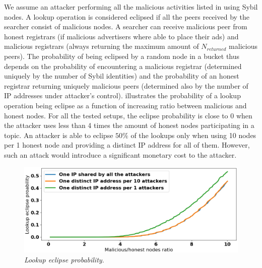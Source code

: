 We assume an attacker performing all the malicious activities listed in  using Sybil nodes. A lookup operation is considered eclipsed if all the peers received by the searcher consist of malicious nodes. A searcher can receive malicious peer from honest registrars (if malicious advertisers where able to place their ads) and malicious registrars (always returning the maximum amount of $N_\textit{returned}$ malicious peers). The probability of being eclipsed by a random node in a bucket thus depends on the probability of encountering a malicious registrar (determined uniquely by the number of Sybil identities) and the probability of an honest registrar returning uniquely malicious peers (determined also by the number of IP addresses under attacker's control).  illustrates the probability of a lookup operation being eclipse as a function of increasing ratio between malicious and honest nodes. For all the tested setups, the eclipse probability is close to $0$ when the attacker uses less than 4 times the amount of honest nodes participating in a topic. An attacker is able to eclipse $50\%$  of the lookups only when using 10 nodes per 1 honest node and providing a distinct IP address for all of them. However, such an attack would introduce a significant monetary cost to the attacker.

\begin{figure}[t]
    \includegraphics[width=1\linewidth]{img/eclipse_probability}
    \caption{\emph{Lookup eclipse probability}.
    }
    \label{fig:eclipse_probability}
\end{figure}


